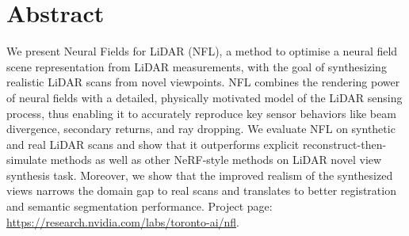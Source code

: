 \section*{Abstract}
We present Neural Fields for LiDAR (NFL), a method to optimise a neural field scene representation from LiDAR measurements, with the goal of synthesizing realistic LiDAR scans from novel viewpoints. 
NFL combines the rendering power of neural fields with a detailed, physically motivated model of the LiDAR sensing process, thus enabling it to accurately reproduce key sensor behaviors like beam divergence, secondary returns, and ray dropping.
We evaluate NFL on synthetic and real LiDAR scans and show that it outperforms explicit reconstruct-then-simulate methods as well as other NeRF-style methods on LiDAR novel view synthesis task. Moreover, we show that the improved realism of the synthesized views narrows the domain gap to real scans and translates to better registration and semantic segmentation performance. Project page: \url{https://research.nvidia.com/labs/toronto-ai/nfl}.